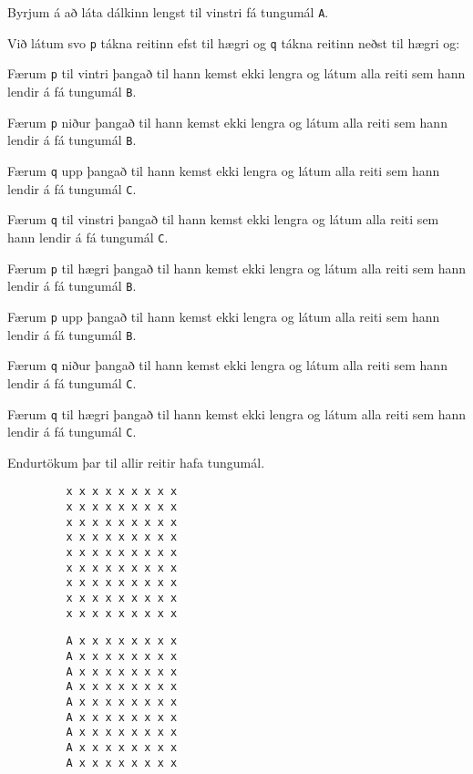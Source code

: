 {
	{
		\item<1-> Byrjum á að láta dálkinn lengst til vinstri fá tungumál \texttt{A}.
		\item<2-> Við látum svo \texttt{p} tákna reitinn efst til hægri og \texttt{q} tákna reitinn neðst til hægri og:
		{
			\item<3-> Færum \texttt{p} til vintri þangað til hann kemst ekki lengra og látum alla reiti sem hann lendir á fá tungumál \texttt{B}.
			\item<4-> Færum \texttt{p} niður þangað til hann kemst ekki lengra og látum alla reiti sem hann lendir á fá tungumál \texttt{B}.
			\item<5-> Færum \texttt{q} upp þangað til hann kemst ekki lengra og látum alla reiti sem hann lendir á fá tungumál \texttt{C}.
			\item<6-> Færum \texttt{q} til vinstri þangað til hann kemst ekki lengra og látum alla reiti sem hann lendir á fá tungumál \texttt{C}.
			\item<7-> Færum \texttt{p} til hægri þangað til hann kemst ekki lengra og látum alla reiti sem hann lendir á fá tungumál \texttt{B}.
			\item<8-> Færum \texttt{p} upp þangað til hann kemst ekki lengra og látum alla reiti sem hann lendir á fá tungumál \texttt{B}.
			\item<9-> Færum \texttt{q} niður þangað til hann kemst ekki lengra og látum alla reiti sem hann lendir á fá tungumál \texttt{C}.
			\item<10-> Færum \texttt{q} til hægri þangað til hann kemst ekki lengra og látum alla reiti sem hann lendir á fá tungumál \texttt{C}.
			\item<11-> Endurtökum þar til allir reitir hafa tungumál.
		}
	}
}

{ \begin{verbatim}
         x x x x x x x x x
         x x x x x x x x x
         x x x x x x x x x
         x x x x x x x x x
         x x x x x x x x x
         x x x x x x x x x
         x x x x x x x x x
         x x x x x x x x x
         x x x x x x x x x
\end{verbatim} }

{ \begin{verbatim}
         A x x x x x x x x
         A x x x x x x x x
         A x x x x x x x x
         A x x x x x x x x
         A x x x x x x x x
         A x x x x x x x x
         A x x x x x x x x
         A x x x x x x x x
         A x x x x x x x x
\end{verbatim} }

